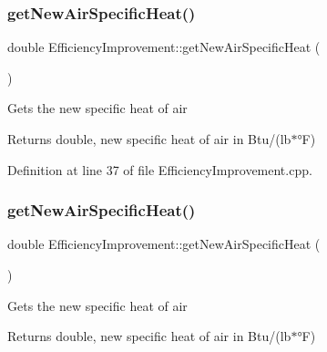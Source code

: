 \subsubsection{\texorpdfstring{get\+New\+Air\+Specific\+Heat()}{getNewAirSpecificHeat()}\hspace{0.1cm}{\footnotesize\ttfamily [2/3]}}
{\footnotesize\ttfamily double Efficiency\+Improvement\+::get\+New\+Air\+Specific\+Heat (\begin{DoxyParamCaption}{ }\end{DoxyParamCaption})}

Gets the new specific heat of air

\begin{DoxyReturn}{Returns}
double, new specific heat of air in Btu/(lb$\ast$°F) 
\end{DoxyReturn}


Definition at line 37 of file Efficiency\+Improvement.\+cpp.

\mbox{\label{class_efficiency_improvement_a71ab10ba190cb99edb85fcd7f679e721}} 
\subsubsection{\texorpdfstring{get\+New\+Air\+Specific\+Heat()}{getNewAirSpecificHeat()}\hspace{0.1cm}{\footnotesize\ttfamily [3/3]}}
{\footnotesize\ttfamily double Efficiency\+Improvement\+::get\+New\+Air\+Specific\+Heat (\begin{DoxyParamCaption}{ }\end{DoxyParamCaption})}

Gets the new specific heat of air

\begin{DoxyReturn}{Returns}
double, new specific heat of air in Btu/(lb$\ast$°F) 
\end{DoxyReturn}
\mbox{\label{class_efficiency_improvement_a37df0eb5d1dc43627e947a610f2a9c08}} 

